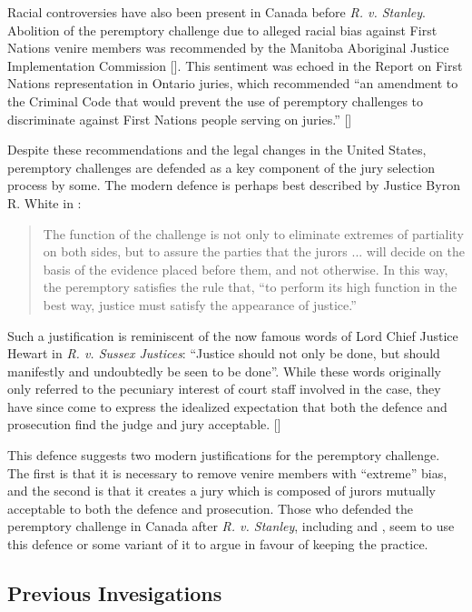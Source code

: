 Racial controversies have also been present in Canada before \textit{R. v. Stanley}. Abolition of the peremptory challenge due to alleged racial bias against First Nations
venire members was recommended by the Manitoba Aboriginal Justice Implementation Commission [\cite{MBajic}]. This sentiment was echoed in the \citeauthor{iacobuccireport} Report on First Nations representation in
Ontario juries, which recommended ``an amendment to the Criminal Code that would
prevent the use of peremptory challenges to discriminate against First
Nations people serving on juries.'' [\cite{iacobuccireport}]

Despite these recommendations and the legal changes in the United States, peremptory challenges are
defended as a key component of the jury selection process by some. The modern defence is perhaps best described by Justice Byron
R. White in \cite{swainvalabama}:

\begin{quote}
The function of the challenge is not only to eliminate extremes of partiality on both sides, but to assure the parties that the
jurors ... will decide on the basis of the evidence placed before them, and not otherwise. In this way,
the peremptory satisfies the rule that, ``to perform its high function in the best way, justice must satisfy the appearance of
justice.''
\end{quote}

Such a justification is reminiscent of the now famous words of Lord Chief Justice Hewart in \textit{R. v. Sussex Justices}:
``Justice should not only be done, but should manifestly and undoubtedly be seen to be done''. While these words originally only referred to the pecuniary interest of court staff involved in the case, they
have since come to express the idealized expectation that both the defence and prosecution find the judge and jury acceptable. [\cite{oakes2016}]

This defence suggests two modern justifications for the peremptory challenge. The first is that it is necessary to remove venire members with
``extreme'' bias, and the second is that it creates a jury which is composed of jurors mutually acceptable to both the defence and prosecution. Those who defended the peremptory
challenge in Canada after \textit{R. v. Stanley}, including
\cite{peremparegood} and \cite{macnabproper}, seem to use this defence or some variant of it to argue in favour of keeping the
practice.

\subsection{Previous Invesigations} \label{sec:prevwork}

